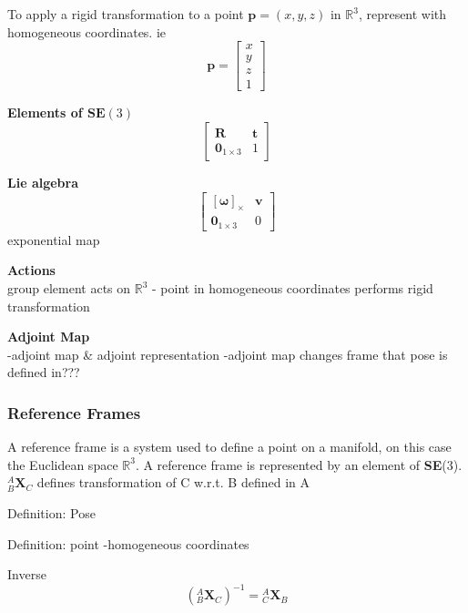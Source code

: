 		To apply a rigid transformation to a point $\textbf{p} = (x,y,z) $ in $\mathbb{R}^3$, represent with homogeneous coordinates. ie
		\begin{equation}
		\mathbf{p} = 
		\begin{bmatrix}
				  x	\\
				  y	\\
				  z	\\
				  1	
		\end{bmatrix}
		\end{equation}
	
		\textbf{Elements of $\textbf{SE}(3)$}
		\begin{equation}
			\begin{bmatrix}
				\mathbf{R}	&	\mathbf{t} \\
			  	\textbf{0}_{1 \times 3}		& 	1 
			\end{bmatrix}
		\end{equation}
		
		\textbf{Lie algebra}
		\begin{equation}
			\begin{bmatrix}
				  [\mathbf{\omega}]_\times	&  \mathbf{v}\\
				  \textbf{0}_{1 \times 3} & 0						  
			\end{bmatrix}
		\end{equation}
		exponential map
		
		\textbf{Actions}\\
		group element acts on $\mathbb{R}^3$ - point in homogeneous coordinates
		performs rigid transformation
		
		\textbf{Adjoint Map}\\
		-adjoint map \& adjoint representation
		-adjoint map changes frame that pose is defined in???
		
	\subsubsection{Reference Frames}
		A reference frame is a system used to define a point on a manifold, on this case the Euclidean space $\mathbb{R}^3$. A reference frame is represented by an element of \textbf{SE}(3).\\
		$^{A}_{B}\mathbf{X}^{}_{C}$ defines transformation of C w.r.t. B defined in A
		
		Definition: Pose
			
		Definition: point
		-homogeneous coordinates		
		
		Inverse
		\begin{equation}
			({^{A}_{B}\mathbf{X}^{}_{C}})^{-1} = {^{A}_{C}\mathbf{X}^{}_{B}}
		\end{equation}
		
